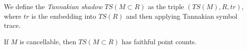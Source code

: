 \begin{proposition}
\end{proposition}


\begin{definition}
  We define the \emph{Tannakian shadow} $TS(M \subset R)$ as the triple $(TS(M), R, tr)$, where $tr$ is the embedding into $TS(R)$ and then applying Tannakian symbol trace. 
\end{definition}

\begin{proposition}
  If $M$ is cancellable, then $TS(M \subset R)$ has faithful point counts. 
\end{proposition}
